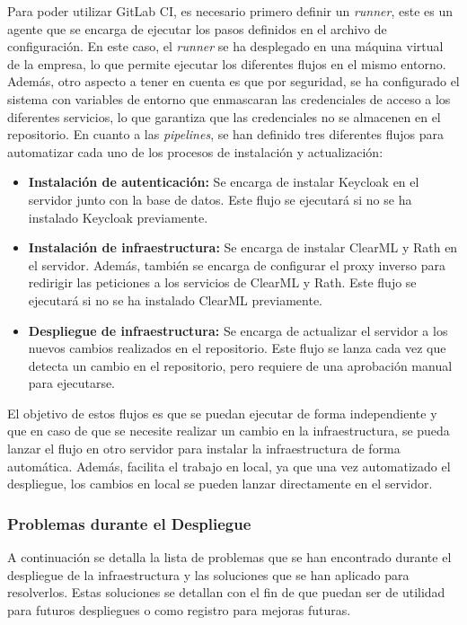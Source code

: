 Para poder utilizar GitLab CI, es necesario primero definir un \textit{runner}, este
es un agente que se encarga de ejecutar los pasos definidos en el archivo
de configuración. En este caso, el \textit{runner} se ha desplegado en una máquina
virtual de la empresa, 
lo que permite ejecutar los diferentes flujos en el mismo entorno. Además,
otro aspecto a tener en cuenta es que por seguridad, se ha configurado el
sistema con variables de entorno que enmascaran las credenciales de acceso
a los diferentes servicios, lo que garantiza que las credenciales no se
almacenen en el repositorio. En cuanto a las \textit{pipelines}, se han definido 
tres diferentes flujos para automatizar cada uno de los procesos de 
instalación y actualización:

\begin{itemize}
    \item \textbf{Instalación de autenticación:} Se encarga de instalar Keycloak
    en el servidor junto con la base de datos. Este flujo se ejecutará si no
    se ha instalado Keycloak previamente.
    \item \textbf{Instalación de infraestructura:} Se encarga de instalar ClearML y Rath
    en el servidor. Además, también se encarga de configurar el proxy inverso
    para redirigir las peticiones a los servicios de ClearML y Rath. Este flujo
    se ejecutará si no se ha instalado ClearML previamente.
    \item \textbf{Despliegue de infraestructura:} Se encarga de actualizar el
    servidor a los nuevos cambios realizados en el repositorio. Este flujo se
    lanza cada vez que detecta un cambio en el repositorio, pero requiere de
    una aprobación manual para ejecutarse.
\end{itemize}

El objetivo de estos flujos es que se puedan ejecutar de forma independiente
y que en caso de que se necesite realizar un cambio en la infraestructura,
se pueda lanzar el flujo en otro servidor para instalar la infraestructura
de forma automática. Además, facilita el trabajo en local, ya que una vez
automatizado el despliegue, los cambios en local se pueden lanzar
directamente en el servidor.


\subsubsection{Problemas durante el Despliegue}
A continuación se detalla la lista de problemas que se han encontrado durante
el despliegue de la infraestructura y las soluciones que se han aplicado para
resolverlos. Estas soluciones se detallan con el fin de que puedan ser de utilidad
para futuros despliegues o como registro para mejoras futuras.

